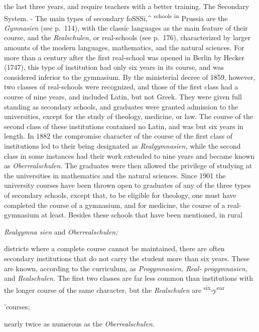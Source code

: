 \documentclass[]{book}
\begin{document}
the last three years, and require teachers with a better training. The Secondary System. - The main types of secondary foSSSi,\^{} \textsuperscript{schools} \textsuperscript{in} Prussia are the \emph{Gymnasien} (see p.~114), with the classic languages as the main feature of their course, and the \emph{Realschulen,} or real-schools (see p.~176), characterized by larger amounts of the modern languages, mathematics, and the natural sciences. For more than a century after the first real-school was opened in Berlin by Hecker (1747), this type of institution had only six years in its course, and was considered inferior to the gymnasium. By the ministerial decree of 1859, however, two classes of real-schools were recognized, and those of the first class had a course of nine years, and included Latin, but not Greek. They were given full standing as secondary schools, and graduates were granted admission to the universities, except for the study of theology, medicine, or law. The course of the second class of these institutions contained no Latin, and was but six years in length. In 1882 the compromise character of the course of the first class of institutions led to their being designated as \emph{Realgymnasien,} while the second class in some instances had their work extended to nine years and became known as \emph{Oberrealschulen.} The graduates were then allowed the privilege of studying at the universities in mathematics and the natural sciences. Since 1901 the university courses have been thrown open to graduates of any of the three types of secondary schools, except that, to be eligible for theology, one must have completed the course of a gymnasium, and for medicine, the course of a real-gymnasium at least. Besides these schools that have been mentioned, in rural

\emph{Realgymna sien} and \emph{Oberrealschulen;}

districts where a complete course cannot be maintained, there are often secondary institutions that do not carry the student more than six years. These are known, according to the curriculum, as \emph{Progymnasien, Real-} \emph{progymnasien,} and \emph{Realschulen.} The first two classes are far less common than institutions with the longer course of the same character, but the \emph{Realschulen} are \textsuperscript{six}-y\textsuperscript{ear}

'courses;

nearly twice as numerous as the \emph{Oberrealschulen.}
\end{document}
